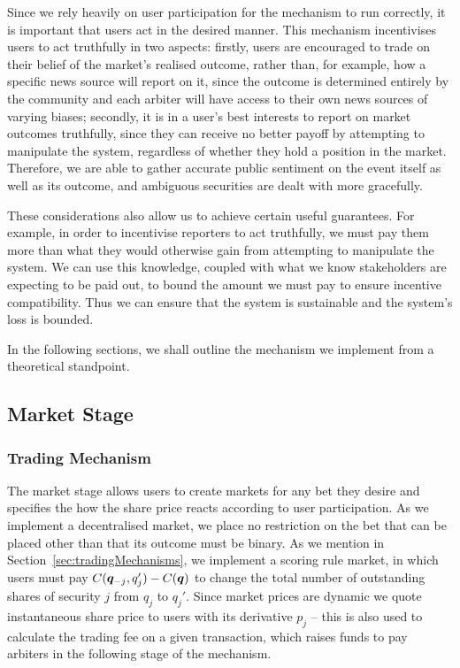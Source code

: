 Since we rely heavily on user participation for the mechanism to run correctly,
it is important that users act in the desired manner. This mechanism
incentivises users to act truthfully in two aspects: firstly, users are
encouraged to trade on their belief of the market's realised outcome, rather
than, for example, how a specific news source will report on it, since the
outcome is determined entirely by the community and each arbiter will have
access to their own news sources of varying biases; secondly, it is in a user's
best interests to report on market outcomes truthfully, since they can receive
no better payoff by attempting to manipulate the system, regardless of whether
they hold a position in the market. Therefore, we are able to gather accurate
public sentiment on the event itself as well as its outcome, and ambiguous
securities are dealt with more gracefully.

These considerations also allow us to achieve certain useful guarantees. For
example, in order to incentivise reporters to act truthfully, we must pay them
more than what they would otherwise gain from attempting to manipulate the
system. We can use this knowledge, coupled with what we know stakeholders are
expecting to be paid out, to bound the amount we must pay to ensure incentive
compatibility. Thus we can ensure that the system is sustainable and the
system's loss is bounded.

In the following sections, we shall outline the mechanism we implement from a
theoretical standpoint. 

\subsection{Market Stage}

\label{sec:marketStage}

\subsubsection{Trading Mechanism}

The market stage allows users to create markets for any bet they desire and
specifies the how the share price reacts according to user participation. As we
implement a decentralised market, we place no restriction on the bet that can
be placed other than that its outcome must be binary. As we mention in
Section~\ref{sec:tradingMechanisms}, we implement a scoring rule market, in
which users must pay $C(\bm{q}_{-j}, q_j')-C(\bm{q})$ to change the total
number of outstanding shares of security $j$ from $q_j$ to $q_j'$.  Since
market prices are dynamic we quote instantaneous share price to users with its
derivative $p_j$ -- this is also used to calculate the trading fee on a given
transaction, which raises funds to pay arbiters in the following stage of the
mechanism.


